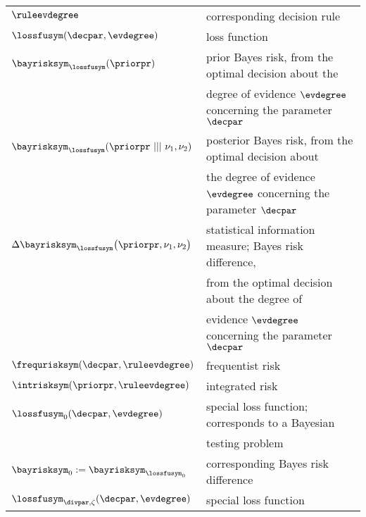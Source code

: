 \begin{longtable}{ll}
\\
\hspace{-0.33cm} $\ruleevdegree$ & corresponding decision rule
\\
\hspace{-0.33cm} ${\lossfusym}({\decpar},{\evdegree})$  & loss function
\\
\hspace{-0.33cm} ${\bayrisksym}_{\lossfusym}({\priorpr})$ & prior Bayes risk, from the optimal decision about the   
\\
\hspace{-0.33cm} $\ $ &
degree of evidence ${\evdegree}$ concerning the parameter ${\decpar}$
\\
\hspace{-0.33cm} ${\bayrisksym}_{\lossfusym}({\priorpr} \ ||| \ \nu_1 , \nu_2)$ &
posterior Bayes risk, from the optimal decision  about    
\\
\hspace{-0.33cm} $\ $ & the degree of evidence ${\evdegree}$ concerning the parameter ${\decpar}$  
\\
\hspace{-0.33cm} $\Delta {\bayrisksym}_{\lossfusym}{\big(}{\priorpr},\nu_1,\nu_2 {\big)}$ & statistical information measure; Bayes risk difference,     
\\
\hspace{-0.33cm} $\ $ & from the optimal decision about the degree of  
\\
\hspace{-0.33cm} $\ $ & evidence ${\evdegree}$ concerning the parameter ${\decpar}$
\\
\hspace{-0.33cm} ${\frequrisksym}({\decpar},{\ruleevdegree})$  & frequentist risk 
\\
\hspace{-0.33cm} ${\intrisksym}({\priorpr},{\ruleevdegree})$  & integrated risk  
\\
\hspace{-0.33cm} ${\lossfusym}_{0}({\decpar},{\evdegree})$ & special loss function;
corresponds to a Bayesian 
\\
\hspace{-0.33cm} $\ $ & testing problem
\\
\hspace{-0.33cm} ${\bayrisksym}_0 := {\bayrisksym}_{{\lossfusym}_0}$ & 
corresponding Bayes risk difference
\\
\hspace{-0.33cm} ${\lossfusym}_{\divpar,\zeta}({\decpar},{\evdegree})$ & special loss function

\end{longtable}
